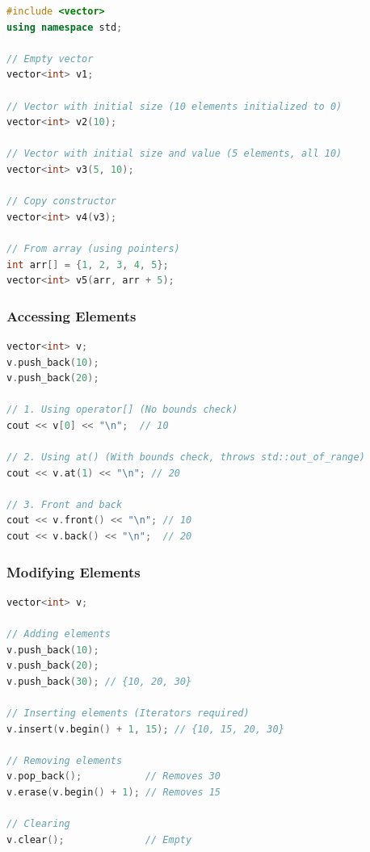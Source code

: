 \begin{lstlisting}[language={C++}]
#include <vector>
using namespace std;

// Empty vector
vector<int> v1;

// Vector with initial size (10 elements initialized to 0)
vector<int> v2(10);

// Vector with initial size and value (5 elements, all 10)
vector<int> v3(5, 10);

// Copy constructor
vector<int> v4(v3);

// From array (using pointers)
int arr[] = {1, 2, 3, 4, 5};
vector<int> v5(arr, arr + 5);
\end{lstlisting}

\hypertarget{accessing-elements}{%
\subsubsection{Accessing Elements}\label{accessing-elements}}

\begin{lstlisting}[language={C++}]
vector<int> v;
v.push_back(10);
v.push_back(20);

// 1. Using operator[] (No bounds check)
cout << v[0] << "\n";  // 10

// 2. Using at() (With bounds check, throws std::out_of_range)
cout << v.at(1) << "\n"; // 20

// 3. Front and back
cout << v.front() << "\n"; // 10
cout << v.back() << "\n";  // 20
\end{lstlisting}

\hypertarget{modifying-elements}{%
\subsubsection{Modifying Elements}\label{modifying-elements}}

\begin{lstlisting}[language={C++}]
vector<int> v;

// Adding elements
v.push_back(10);
v.push_back(20);
v.push_back(30); // {10, 20, 30}

// Inserting elements (Iterators required)
v.insert(v.begin() + 1, 15); // {10, 15, 20, 30}

// Removing elements
v.pop_back();           // Removes 30
v.erase(v.begin() + 1); // Removes 15

// Clearing
v.clear();              // Empty
\end{lstlisting}

